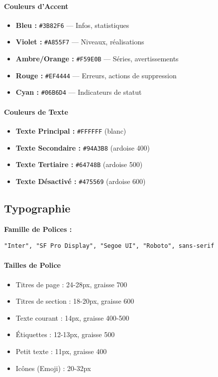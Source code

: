 \documentclass[12pt, a4paper]{report}
\begin{document}
\paragraph{Couleurs d'Accent}
\begin{itemize}
    \item \textbf{Bleu :} \texttt{\#3B82F6} --- Infos, statistiques
    \item \textbf{Violet :} \texttt{\#A855F7} --- Niveaux, réalisations
    \item \textbf{Ambre/Orange :} \texttt{\#F59E0B} --- Séries, avertissements
    \item \textbf{Rouge :} \texttt{\#EF4444} --- Erreurs, actions de suppression
    \item \textbf{Cyan :} \texttt{\#06B6D4} --- Indicateurs de statut
\end{itemize}

\paragraph{Couleurs de Texte}
\begin{itemize}
    \item \textbf{Texte Principal :} \texttt{\#FFFFFF} (blanc)
    \item \textbf{Texte Secondaire :} \texttt{\#94A3B8} (ardoise 400)
    \item \textbf{Texte Tertiaire :} \texttt{\#64748B} (ardoise 500)
    \item \textbf{Texte Désactivé :} \texttt{\#475569} (ardoise 600)
\end{itemize}

\subsection{Typographie}

\textbf{Famille de Polices :}
\begin{verbatim}
"Inter", "SF Pro Display", "Segoe UI", "Roboto", sans-serif
\end{verbatim}

\paragraph{Tailles de Police}
\begin{itemize}
    \item Titres de page : 24-28px, graisse 700
    \item Titres de section : 18-20px, graisse 600
    \item Texte courant : 14px, graisse 400-500
    \item Étiquettes : 12-13px, graisse 500
    \item Petit texte : 11px, graisse 400
    \item Icônes (Emoji) : 20-32px
\end{itemize}
\end{document}
